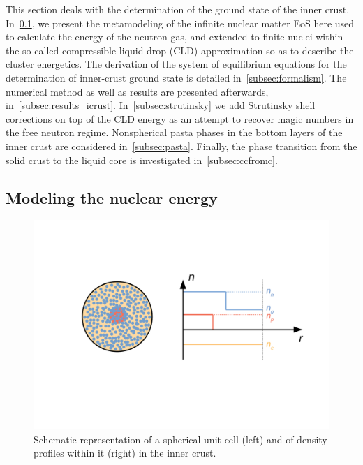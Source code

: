 This section deals with the determination of the ground state of the inner
crust. In~\ref{subsec:nucenergy}, we present the metamodeling of the
infinite nuclear matter EoS here used to calculate the energy of the neutron 
gas, and extended to finite nuclei within the so-called compressible liquid 
drop (CLD) approximation so as to describe the cluster energetics. The derivation of the 
system of equilibrium equations for the determination of inner-crust ground state 
is detailed in~\ref{subsec:formalism}. The numerical
method as well as results are presented afterwards, 
in~\ref{subsec:results_icrust}. In~\ref{subsec:strutinsky} we add Strutinsky
shell corrections on top of the CLD energy as an attempt to recover magic
numbers in the free neutron regime. Nonspherical pasta phases in the bottom 
layers of the inner crust are considered in~\ref{subsec:pasta}. Finally, the
phase transition from the solid crust to the liquid core is investigated 
in~\ref{subsec:ccfromc}.

\subsection{Modeling the nuclear energy}\label{subsec:nucenergy}

\begin{figure}[!t]
\begin{center}
  \includegraphics[width=0.9\linewidth]{figures/icrust_wscell.pdf}
\end{center}
\caption[Cartoon of a Wigner-Seitz cell in the inner crust]{Schematic 
  representation of a spherical unit cell (left) and of 
density profiles within it (right) in the inner crust.}\label{fig:icrust_wscell}
\end{figure}

